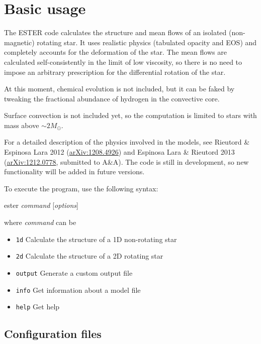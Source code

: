 \chapter{Basic usage}

The ESTER code calculates the structure and mean flows of an isolated (non-magnetic) rotating
star. It uses realistic physics (tabulated opacity and EOS) and completely accounts for
the deformation of the star.
The mean flows are calculated self-consistently in the limit of low viscosity, so there is
no need to impose an arbitrary prescription for the differential rotation of the star.

At this moment, chemical evolution is not included, but it can be faked by tweaking the fractional
abundance of hydrogen in the convective core.

Surface convection is not included yet, so the computation is limited to stars with mass above
$\sim 2 M_\odot$.

For a detailed description of the physics involved in the models, 
see Rieutord \& Espinosa Lara 2012 (\href{http://arxiv.org/abs/1208.4926}{arXiv:1208.4926}) and
Espinosa Lara \& Rieutord 2013 (\href{http://arxiv.org/abs/1212.0778}{arXiv:1212.0778}, submitted to A\&A).
The code is still in development, so new functionality will be added in future versions.

To execute the program, use the following syntax:
\begin{center}
ester \emph{command} [\emph{options}]
\end{center}
where \emph{command} can be
\begin{itemize}
\item {\tt 1d} Calculate the structure of a 1D non-rotating star
\item {\tt 2d} Calculate the structure of a 2D rotating star
\item {\tt output} Generate a custom output file
\item {\tt info} Get information about a model file
\item {\tt help} Get help
\end{itemize}



\section{Configuration files}

